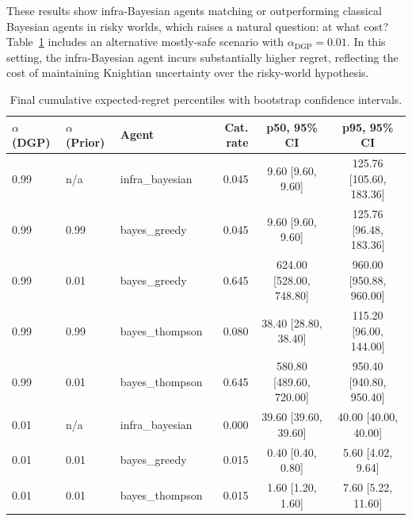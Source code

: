 These results show infra-Bayesian agents matching or outperforming classical Bayesian agents in risky worlds, which raises a natural question: at what cost? Table~\ref{tab:trap-bandit-results} includes an alternative mostly-safe scenario with \(\alpha_{\mathrm{DGP}}=0.01\). In this setting, the infra-Bayesian agent incurs substantially higher regret, reflecting the cost of maintaining Knightian uncertainty over the risky-world hypothesis.

\begin{table}[t]
\centering
\small
\begin{tabular}{lll rcc}
\toprule
$\alpha$ (DGP) & $\alpha$ (Prior) & Agent & Cat. rate & p50, 95\% CI & p95, 95\% CI \\
\midrule
0.99 & n/a & infra\_bayesian & 0.045 & 9.60 [9.60, 9.60] & 125.76 [105.60, 183.36] \\
0.99 & 0.99 & bayes\_greedy & 0.045 & 9.60 [9.60, 9.60] & 125.76 [96.48, 183.36] \\
0.99 & 0.01 & bayes\_greedy & 0.645 & 624.00 [528.00, 748.80] & 960.00 [950.88, 960.00] \\
0.99 & 0.99 & bayes\_thompson & 0.080 & 38.40 [28.80, 38.40] & 115.20 [96.00, 144.00] \\
0.99 & 0.01 & bayes\_thompson & 0.645 & 580.80 [489.60, 720.00] & 950.40 [940.80, 950.40] \\
0.01 & n/a & infra\_bayesian & 0.000 & 39.60 [39.60, 39.60] & 40.00 [40.00, 40.00] \\
0.01 & 0.01 & bayes\_greedy & 0.015 & 0.40 [0.40, 0.80] & 5.60 [4.02, 9.64] \\
0.01 & 0.01 & bayes\_thompson & 0.015 & 1.60 [1.20, 1.60] & 7.60 [5.22, 11.60] \\
\bottomrule
\end{tabular}
\caption{Final cumulative expected-regret percentiles with bootstrap confidence intervals.}
\label{tab:trap-bandit-results}
\end{table}

